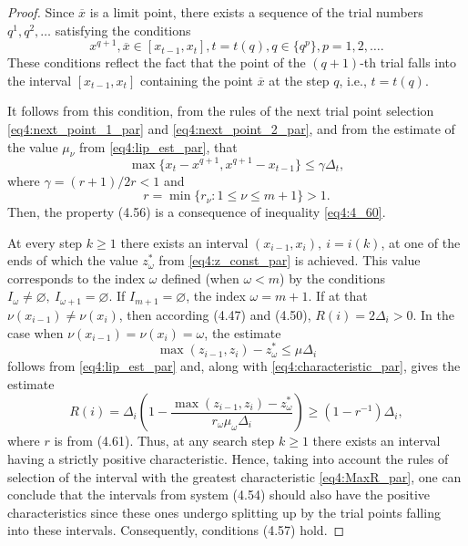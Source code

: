 \begin{proof}
  Since $\overline x$ is a limit point, there exists a sequence of the trial numbers $q^1,q^2,\dots$ satisfying the conditions
  \begin{equation}
    x^{q+1},\overline x\in[x_{t-1},x_t], t=t(q),q\in\{q^p\},p=1,2,\dots.
  \end{equation}
  These conditions reflect the fact that the point of the $(q+1)$-th trial falls into the interval $[x_{t-1},x_t]$ containing the point $\overline x$ at the step $q$, i.e., $t=t(q)$.

  It follows from this condition, from the rules of the next trial point selection \eqref{eq4:next_point_1_par} and \eqref{eq4:next_point_2_par}, and from the estimate of the value $\mu_\nu$ from \eqref{eq4:lip_est_par}, that
  \begin{equation}
    \label{eq4:4_60}
    \max\{x_t-x^{q+1},x^{q+1}-x_{t-1}\}\le\gamma \Delta_t,
  \end{equation}
  where $\gamma=(r+1)/2r<1$ and
  \begin{equation}
    r=\min\{r_\nu:1\le\nu\le m+1\}>1.
  \end{equation}
  Then, the property (4.56) is a consequence of inequality \eqref{eq4:4_60}.

  At every step $k\ge 1$ there exists an interval $(x_{i-1},x_i), \:i=i(k)$, at one of the ends of which the value $z^*_\omega$ from \eqref{eq4:z_const_par} is achieved. This value corresponds to the index $\omega$ defined (when $\omega<m$) by the conditions $I_\omega\not= \varnothing,\: I_{\omega+1} =  \varnothing$. If $I_{m+1}= \varnothing$, the index $\omega=m+1$. If at that $\nu(x_{i -1} )\not = \nu(x_i )$, then according (4.47) and (4.50), $R(i)=2\Delta_i>0$. In the case when $\nu(x_{i -1} )= \nu(x_i )=\omega$, the estimate
  \begin{displaymath}
    \max(z_{i-1}, z_i)-z^*_\omega\le\mu\Delta_i
  \end{displaymath}
  follows from \eqref{eq4:lip_est_par} and, along with \eqref{eq4:characteristic_par}, gives the estimate
  \begin{displaymath}
    R(i)=\Delta_i\left(1-\frac{\max(z_{i-1},z_i)-z^*_\omega}{r_\omega\mu_\omega\Delta_i}\right)\ge (1-r^{-1})\Delta_i,
  \end{displaymath}
  where $r$ is from (4.61). Thus, at any search step $k\ge 1$ there exists an interval having a strictly positive characteristic. Hence, taking into account the rules of selection of the interval with the greatest characteristic \eqref{eq4:MaxR_par}, one can conclude that the intervals from system (4.54) should also have the positive characteristics since these ones undergo splitting up by the trial points falling into these intervals. Consequently, conditions (4.57) hold.


\end{proof}
